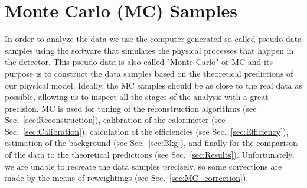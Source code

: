 \chapter{Monte Carlo (MC) Samples}
\label{sec:MCSamples}

In order to analyze the data we use the computer-generated so-called pseudo-data samples using the software that simulates the physical processes that happen in the detector. This pseudo-data is also called "Monte Carlo" or MC and its purpose is to construct the data samples based on the theoretical predictions of our physical model. Ideally, the MC samples should be as close to the real data as possible, allowing us to inspect all the stages of the analysis with a great precision. MC is used for tuning of the reconstruction algorithms (see Sec.~\ref{sec:Reconstruction}), calibration of the calorimeter (see Sec.~\ref{sec:Calibration}), calculation of the efficiencies (see Sec.~\ref{sec:Efficiency}), estimation of the background (see Sec.~\ref{sec:Bkg}), and finally for the comparison of the data to the theoretical predictions (see Sec.~\ref{sec:Results}). Unfortunately, we are unable to recreate the data samples precisely, so some corrections are made by the means of reweightings (see Sec.~\ref{sec:MC_correction}).

\begin{figure}
\end{figure}

